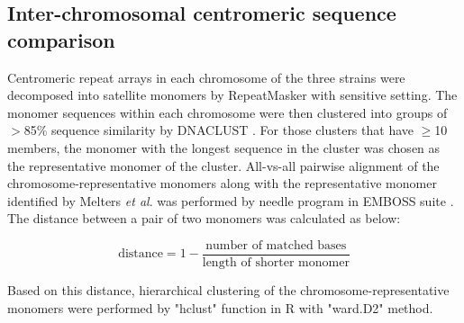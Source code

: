\subsection*{Inter-chromosomal centromeric sequence comparison}
  Centromeric repeat arrays in each chromosome of the three strains were decomposed into satellite monomers by RepeatMasker with sensitive setting. The monomer sequences within each chromosome were then clustered into groups of $>$85\% sequence similarity by DNACLUST \cite{Ghodsi2011}. For those clusters that have $\geq$10 members, the monomer with the longest sequence in the cluster was chosen as the representative monomer of the cluster. All-vs-all pairwise alignment of the chromosome-representative monomers along with the representative monomer identified by Melters \textit{et al}. was performed by needle program in EMBOSS suite \cite{Rice2000}. The distance between a pair of two monomers was calculated as below:

  \[
    \mbox{distance} = 1 - \frac{\mbox{number of matched bases}}{\mbox{length of shorter monomer}}
  \]

  Based on this distance, hierarchical clustering of the chromosome-representative monomers were performed by "hclust" function in R with "ward.D2" method.

